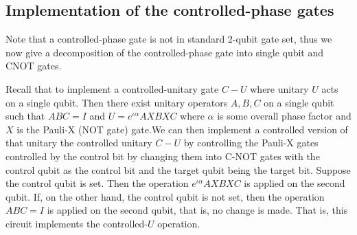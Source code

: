\subsection{Implementation of the controlled-phase gates}
Note that a controlled-phase gate is not in standard 2-qubit gate set, thus we now give a decomposition of the controlled-phase gate into single qubit and CNOT gates.

Recall that to implement a controlled-unitary gate $C-U$ where unitary $U$ acts on a single qubit. Then there exist unitary operators $A,B,C$ on a single qubit such that $ABC=I$ and $U=e^{\iota\alpha}AXBXC$ where $\alpha$ is some overall phase factor and $X$ is the Pauli-X (NOT gate) gate.We can then implement a controlled version of that unitary the controlled unitary $C-U$ by controlling the Pauli-X gates controlled by the control bit by changing them into C-NOT gates with the control qubit as the control bit and the target qubit being the target bit. Suppose the control qubit is set. Then the operation $e^{\iota\alpha}AXBXC$ is applied on the second qubit. If, on the other hand, the control qubit is not set, then the operation $ABC=I$ is applied on the second qubit, that is, no change is made. That is, this circuit implements the controlled-$U$ operation. 

